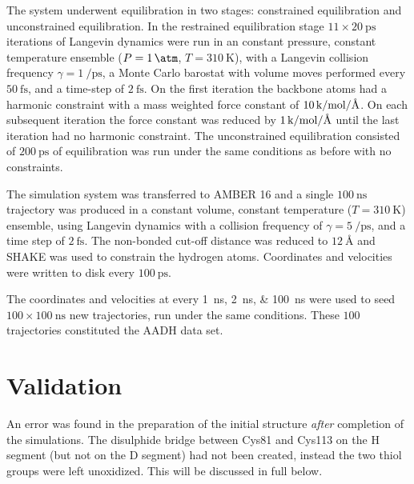The system underwent equilibration in two stages: constrained equilibration and unconstrained equilibration. In the restrained equilibration stage $11 \times \SI{20}{\pico\second}$ iterations of Langevin dynamics were run in an constant pressure, constant temperature ensemble ($P=\SI{1}{\atm}$, $T=\SI{310}{\kelvin}$), with a Langevin collision frequency $\gamma=\SI{1}{\per\pico\second}$, a Monte Carlo barostat with volume moves performed every  $\SI{50}{\femto\second}$, and a time-step of $\SI{2}{\femto\second}$. On the first iteration the backbone atoms had a harmonic constraint with a mass weighted force constant of  $\SI{10}{\kilo\cal\per\mol\per\angstrom}$. On each subsequent iteration the force constant was reduced by $\SI{1}{\kilo\cal\per\mol\per\angstrom}$ until the last iteration had no harmonic constraint. The unconstrained equilibration consisted of $\SI{200}{\pico\second}$ of equilibration was run under the same conditions as before with no constraints. 

The simulation system was transferred to AMBER 16 \cite{caseAMBER} and a single  $\SI{100}{\nano\second}$ trajectory was produced in a constant volume, constant temperature ($T=\SI{310}{\kelvin}$) ensemble, using Langevin dynamics with a collision frequency of $\gamma=\SI{5}{\per\pico\second}$, and a time step of $\SI{2}{\femto\second}$. The non-bonded cut-off distance was reduced to $\SI{12}{\angstrom}$ and SHAKE was used to constrain the hydrogen atoms. Coordinates and velocities were written to disk every $\SI{100}{\pico\second}$.  

The coordinates and velocities at every \SIlist[list-final-separator = { ... }]{1; 2; 100}{\nano\second} were used to seed $100 \times \SI{100}{\nano\second}$ new trajectories, run under the same conditions. These $100$ trajectories constituted the AADH data set. 

\section{Validation}\label{sec:aadh_validation}

An error was found in the preparation of the initial structure \emph{after} completion of the simulations. The disulphide bridge between Cys81 and Cys113 on the H segment (but not on the D segment) had not been created, instead the two thiol groups were left unoxidized. This will be discussed in full below. 

